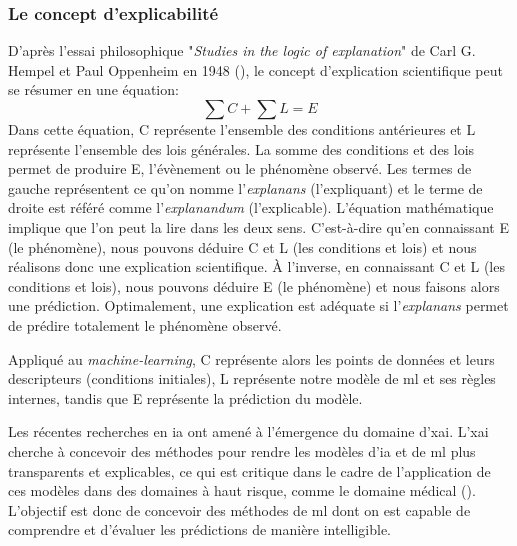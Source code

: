 \subsubsection{Le concept d'explicabilité}
D'après l'essai philosophique "\textit{Studies in the logic of explanation}" de Carl G. Hempel et Paul Oppenheim en 1948 (\cite{hempel_studies_1948}), le concept d'explication scientifique peut se résumer en une équation:
\[\sum C + \sum L = E\]
Dans cette équation, C représente l'ensemble des conditions antérieures et L représente l'ensemble des lois générales. La somme des conditions et des lois permet de produire E, l'évènement ou le phénomène observé. Les termes de gauche représentent ce qu’on nomme l’\textit{explanans} (l’expliquant) et le terme de droite est référé comme l’\textit{explanandum} (l’explicable). L’équation mathématique implique que l’on peut la lire dans les deux sens. C’est-à-dire qu’en connaissant E (le phénomène), nous pouvons déduire C et L (les conditions et lois) et nous réalisons donc une explication scientifique. À l’inverse, en connaissant C et L (les conditions et lois), nous pouvons déduire E (le phénomène) et nous faisons alors une prédiction. Optimalement, une explication est adéquate si l’\textit{explanans} permet de prédire totalement le phénomène observé.

Appliqué au \textit{machine-learning}, C représente alors les points de données et leurs descripteurs (conditions initiales), L représente notre modèle de \gls{ml} et ses règles internes, tandis que E représente la prédiction du modèle.

Les récentes recherches en \gls{ia} ont amené à l'émergence du domaine d'\gls{xai}. L'\gls{xai} cherche à concevoir des méthodes pour rendre les modèles d'\gls{ia} et de \gls{ml} plus transparents et explicables, ce qui est critique dans le cadre de l'application de ces modèles dans des domaines à haut risque, comme le domaine médical (\cite{arrieta_explainable_2019}). L'objectif est donc de concevoir des méthodes de \gls{ml} dont on est capable de comprendre et d'évaluer les prédictions de manière intelligible.

